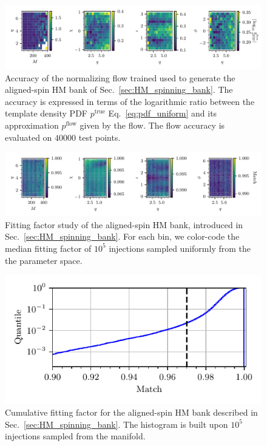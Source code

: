 \documentclass[twocolumn,showpacs,preprintnumbers,nofootinbib,prd,
superscriptaddress,10pt]{revtex4-2}
\begin{document}
\begin{figure}[t]
	\includegraphics[scale = 1.]{HM_flow_accuracy}
	\caption{Accuracy of the normalizing flow trained used to generate the aligned-spin HM bank of Sec.~\ref{sec:HM_spinning_bank}. The accuracy is expressed in terms of the logarithmic ratio between the template density PDF $p^\text{true}$ Eq.~\eqref{eq:pdf_uniform} and its approximation $p^\text{flow}$ given by the flow. The flow accuracy is evaluated on $40000$ test points.}
	\label{fig:HM_flow}
\end{figure}

\begin{figure}[t]
	\includegraphics[scale = 1.]{HM_injections}
	\caption{Fitting factor study of the aligned-spin HM bank, introduced in Sec.~\ref{sec:HM_spinning_bank}. For each bin, we color-code the median fitting factor of $10^5$ injections sampled uniformly from the the parameter space.}
	\label{fig:HM_fitting_factor}
\end{figure}

\begin{figure}[t]
	\centering
	\includegraphics[scale = 1.]{HM_hist}
	\caption{Cumulative fitting factor for the aligned-spin HM bank described in Sec.~\ref{sec:HM_spinning_bank}. The histogram is built upon $10^5$ injections sampled from the manifold.}
	\label{fig:HM_hist}
\end{figure}
\end{document}
